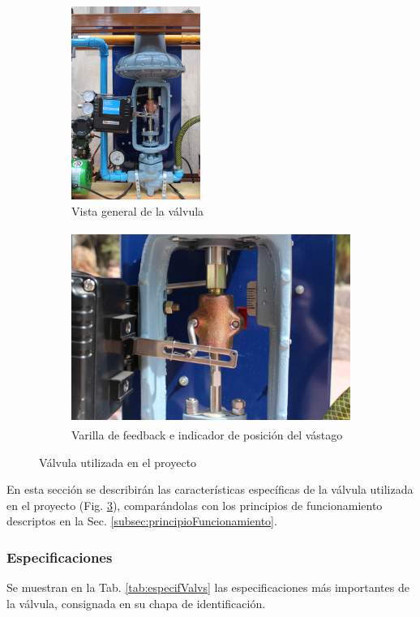 \begin{figure}[t]
        \centering
        \begin{subfigure}[b]{0.31\textwidth}
		\centering
\includegraphics[height=6.3cm]{Cap2-DisenoEnsamblado/images/IMG_5129.JPG}
		\caption{Vista general de la válvula}
		\label{fig:fotoValvCompl}
        \end{subfigure}%
	\hfill
	\begin{subfigure}[b]{0.69\textwidth}
		\centering
\includegraphics[height=6.3cm]{Cap2-DisenoEnsamblado/images/IMG_5030.JPG}
	\caption{Varilla de feedback e indicador de posición del vástago}
		\label{fig:fotoValvDetalle}
	\end{subfigure}%
	\caption{Válvula utilizada en el proyecto}
	\label{fig:fotoValv}
\end{figure}

En esta sección se describirán las características específicas de la válvula
utilizada en el proyecto (Fig. \ref{fig:fotoValv}), comparándolas con los
principios de funcionamiento
descriptos en la Sec. \ref{subsec:principioFuncionamiento}.

\subsubsection{Especificaciones}
Se muestran en la Tab. \ref{tab:especifValvs} las especificaciones más
importantes de la válvula, consignada en su chapa de identificación.

